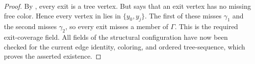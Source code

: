 \begin{proof}
By , every exit is a tree vertex.  But
 says that an exit vertex has no missing free
color.  Hence every vertex in  lies in
$\{y_0,y_j\}$.  The first of these misses $\gamma_1$ and the second
misses $\gamma_2$, so every exit misses a member of $\Gamma$.  This is
the required exit-coverage field.  All fields of the structural
configuration have now been checked for the current edge identity,
coloring, and ordered tree-sequence, which proves the asserted existence.
\end{proof}
